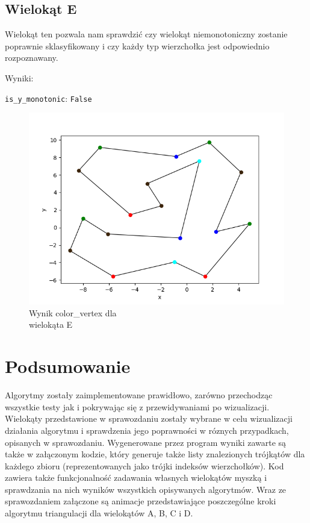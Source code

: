 \documentclass[11pt,a4paper]{article}
\begin{document}
\subsection{Wielokąt E}
Wielokąt ten pozwala nam sprawdzić czy wielokąt niemonotoniczny
zostanie poprawnie sklasyfikowany i czy każdy typ wierzchołka jest
odpowiednio rozpoznawany.

Wyniki:

\verb|is_y_monotonic|: \verb|False|

\begin{figure}[H]
    \centering
    \includegraphics[scale=0.5]{res/pol_e_colors.png}
    \caption{Wynik \ttfamily color\_vertex \normalfont dla \\wielokąta E}
\end{figure}

\section{Podsumowanie}
Algorytmy zostały zaimplementowane prawidłowo, zarówno przechodząc wszystkie
testy jak i pokrywając się z przewidywaniami po wizualizacji. Wielokąty przedstawione
w sprawozdaniu zostały wybrane w celu wizualizacji działania algorytmu
i sprawdzenia jego poprawności w róznych przypadkach, opisanych 
w sprawozdaniu. Wygenerowane przez program wyniki zawarte są także
w załączonym kodzie, który generuje także listy znalezionych trójkątów 
dla każdego zbioru (reprezentowanych jako trójki indeksów wierzchołków).
Kod zawiera także funkcjonalność zadawania własnych wielokątów myszką
i sprawdzania na nich wyników wszystkich opisywanych algorytmów.
Wraz ze sprawozdaniem załączone są animacje przedstawiające poszczególne
kroki algorytmu triangulacji dla wielokątów A, B, C i D.
\end{document}

